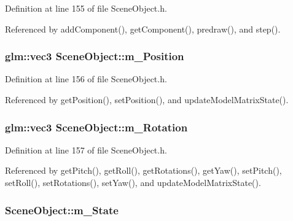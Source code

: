Definition at line 155 of file Scene\+Object.\+h.



Referenced by add\+Component(), get\+Component(), predraw(), and step().

\subsubsection[{\texorpdfstring{m\+\_\+\+Position}{m_Position}}]{\setlength{\rightskip}{0pt plus 5cm}glm\+::vec3 Scene\+Object\+::m\+\_\+\+Position\hspace{0.3cm}{\ttfamily [private]}}\hypertarget{class_scene_object_ad657befa8278678b73cafb62dec70b7a}{}\label{class_scene_object_ad657befa8278678b73cafb62dec70b7a}


Definition at line 156 of file Scene\+Object.\+h.



Referenced by get\+Position(), set\+Position(), and update\+Model\+Matrix\+State().

\subsubsection[{\texorpdfstring{m\+\_\+\+Rotation}{m_Rotation}}]{\setlength{\rightskip}{0pt plus 5cm}glm\+::vec3 Scene\+Object\+::m\+\_\+\+Rotation\hspace{0.3cm}{\ttfamily [private]}}\hypertarget{class_scene_object_a925acd4f041f1f1796652cabf917ca90}{}\label{class_scene_object_a925acd4f041f1f1796652cabf917ca90}


Definition at line 157 of file Scene\+Object.\+h.



Referenced by get\+Pitch(), get\+Roll(), get\+Rotations(), get\+Yaw(), set\+Pitch(), set\+Roll(), set\+Rotations(), set\+Yaw(), and update\+Model\+Matrix\+State().

\subsubsection[{\texorpdfstring{m\+\_\+\+State}{m_State}}]{ Scene\+Object\+::m\+\_\+\+State\hspace{0.3cm}{\ttfamily [private]}}\hypertarget{class_scene_object_a3648197f2a904ef0f7cc379ee0858e79}{}\label{class_scene_object_a3648197f2a904ef0f7cc379ee0858e79}


